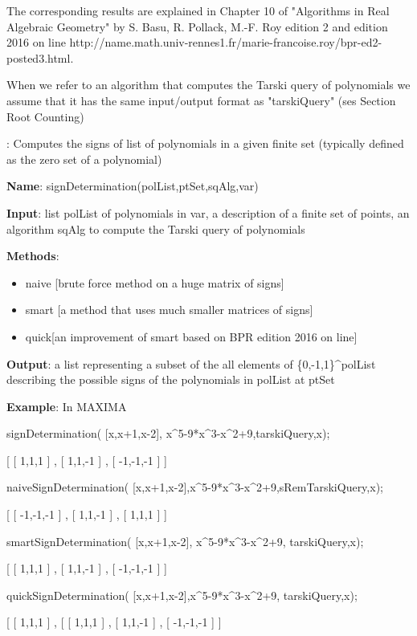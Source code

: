 \documentclass{article}
\begin{document}
The corresponding results are explained in Chapter 10 of "Algorithms in Real
Algebraic Geometry" by S. Basu, R. Pollack, M.-F. Roy edition 2 and edition
2016 on line
http://name.math.univ-rennes1.fr/marie-francoise.roy/bpr-ed2-posted3.html.

 When we refer to an algorithm that computes the Tarski query of
polynomials we assume that it has the same input/output format as
"tarskiQuery" (ses Section Root Counting)

:
  Computes the signs of list of polynomials in a given finite set (typically
  defined as the zero set of a polynomial)
  
{\bf Name}: signDetermination(polList,ptSet,sqAlg,var)
  
{\bf Input}: list polList of polynomials in var, a description of a finite set of
  points, an algorithm sqAlg to compute the Tarski query of polynomials
  
{\bf Methods}:
  \begin{itemize}
    \item naive [brute force method on a huge matrix of signs]
    \item smart [a method that uses much smaller matrices of signs]
    \item quick[an improvement of smart based on BPR edition 2016 on line]
  \end{itemize}

  
{\bf Output}: a list representing a subset of the all elements of
  \{0,-1,1\}\^{}polList describing the possible signs of the polynomials in
  polList at ptSet
  
{\bf Example}: In MAXIMA

signDetermination( [x,x+1,x-2], x\^{}5-9*x\^{}3-x\^{}2+9,tarskiQuery,x);

[ [ 1,1,1 ] , [ 1,1,-1 ] , [ -1,-1,-1 ] ]

naiveSignDetermination( [x,x+1,x-2],x\^{}5-9*x\^{}3-x\^{}2+9,sRemTarskiQuery,x);
    
     [ [ -1,-1,-1 ] , [ 1,1,-1 ] , [ 1,1,1 ] ]
     
smartSignDetermination( [x,x+1,x-2], x\^{}5-9*x\^{}3-x\^{}2+9, tarskiQuery,x);
    
    [ [ 1,1,1 ] , [ 1,1,-1 ] , [ -1,-1,-1 ] ]
    
    quickSignDetermination( [x,x+1,x-2],x\^{}5-9*x\^{}3-x\^{}2+9, tarskiQuery,x);
    
    [ [ 1,1,1 ] , [ [ 1,1,1 ] , [ 1,1,-1 ] , [ -1,-1,-1 ] ]
    
\end{document}
